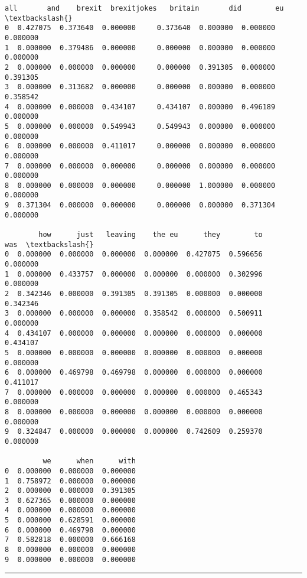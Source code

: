             \begin{tcolorbox}[breakable, size=fbox, boxrule=.5pt, pad at break*=1mm, opacityfill=0]
\begin{Verbatim}[commandchars=\\\{\}]
        all       and    brexit  brexitjokes   britain       did        eu  \textbackslash{}
0  0.427075  0.373640  0.000000     0.373640  0.000000  0.000000  0.000000
1  0.000000  0.379486  0.000000     0.000000  0.000000  0.000000  0.000000
2  0.000000  0.000000  0.000000     0.000000  0.391305  0.000000  0.391305
3  0.000000  0.313682  0.000000     0.000000  0.000000  0.000000  0.358542
4  0.000000  0.000000  0.434107     0.434107  0.000000  0.496189  0.000000
5  0.000000  0.000000  0.549943     0.549943  0.000000  0.000000  0.000000
6  0.000000  0.000000  0.411017     0.000000  0.000000  0.000000  0.000000
7  0.000000  0.000000  0.000000     0.000000  0.000000  0.000000  0.000000
8  0.000000  0.000000  0.000000     0.000000  1.000000  0.000000  0.000000
9  0.371304  0.000000  0.000000     0.000000  0.000000  0.371304  0.000000

        how      just   leaving    the eu      they        to       was  \textbackslash{}
0  0.000000  0.000000  0.000000  0.000000  0.427075  0.596656  0.000000
1  0.000000  0.433757  0.000000  0.000000  0.000000  0.302996  0.000000
2  0.342346  0.000000  0.391305  0.391305  0.000000  0.000000  0.342346
3  0.000000  0.000000  0.000000  0.358542  0.000000  0.500911  0.000000
4  0.434107  0.000000  0.000000  0.000000  0.000000  0.000000  0.434107
5  0.000000  0.000000  0.000000  0.000000  0.000000  0.000000  0.000000
6  0.000000  0.469798  0.469798  0.000000  0.000000  0.000000  0.411017
7  0.000000  0.000000  0.000000  0.000000  0.000000  0.465343  0.000000
8  0.000000  0.000000  0.000000  0.000000  0.000000  0.000000  0.000000
9  0.324847  0.000000  0.000000  0.000000  0.742609  0.259370  0.000000

         we      when      with
0  0.000000  0.000000  0.000000
1  0.758972  0.000000  0.000000
2  0.000000  0.000000  0.391305
3  0.627365  0.000000  0.000000
4  0.000000  0.000000  0.000000
5  0.000000  0.628591  0.000000
6  0.000000  0.469798  0.000000
7  0.582818  0.000000  0.666168
8  0.000000  0.000000  0.000000
9  0.000000  0.000000  0.000000
\end{Verbatim}
\end{tcolorbox}
        
    \begin{center}\rule{0.5\linewidth}{0.5pt}\end{center}

